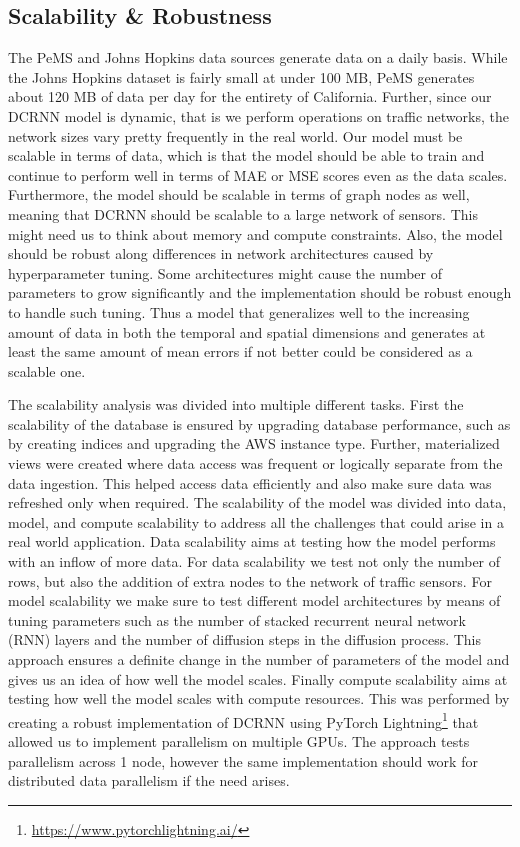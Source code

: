 \documentclass{article}
\begin{document}
\subsection{Scalability \& Robustness}

The PeMS and Johns Hopkins data sources generate data on a daily basis. While the Johns Hopkins dataset is fairly small at under 100 MB, PeMS generates about 120 MB of data per day for the entirety of California. Further, since our DCRNN model is dynamic, that is we perform operations on traffic networks, the network sizes vary pretty frequently in the real world. Our model must be scalable in terms of data, which is that the model should be able to train and continue to perform well in terms of MAE or MSE scores even as the data scales. Furthermore, the model should be scalable in terms of graph nodes as well, meaning that DCRNN should be scalable to a large network of sensors. This might need us to think about memory and compute constraints. Also, the model should be robust along differences in network architectures caused by hyperparameter tuning. Some architectures might cause the number of parameters to grow significantly and the implementation should be robust enough to handle such tuning. Thus a model that generalizes well to the increasing amount of data in both the temporal and spatial dimensions and generates at least the same amount of mean errors if not better could be considered as a scalable one.

The scalability analysis was divided into multiple different tasks. First the scalability of the database is ensured by upgrading database performance, such as by creating indices and upgrading the AWS instance type. Further, materialized views were created where data access was frequent or logically separate from the data ingestion. This helped access data efficiently and also make sure data was refreshed only when required. The scalability of the model was divided into data, model, and compute scalability to address all the challenges that could arise in a real world application. Data scalability aims at testing how the model performs with an inflow of more data. For data scalability we test not only the number of rows, but also the addition of extra nodes to the network of traffic sensors. For model scalability we make sure to test different model architectures by means of tuning parameters such as the number of stacked recurrent neural network (RNN) layers and the number of diffusion steps in the diffusion process. This approach ensures a definite change in the number of parameters of the model and gives us an idea of how well the model scales. Finally compute scalability aims at testing how well the model scales with compute resources. This was performed by creating a robust implementation of DCRNN using PyTorch Lightning\footnote{\url{https://www.pytorchlightning.ai/}} that allowed us to implement parallelism on multiple GPUs. The approach tests parallelism across 1 node, however the same implementation should work for distributed data parallelism if the need arises.
\end{document}
